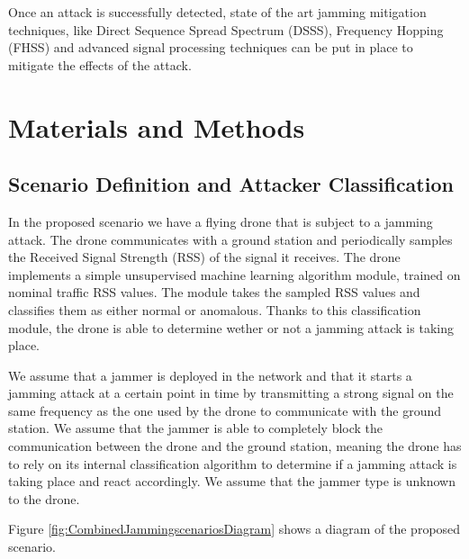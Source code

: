\documentclass[futureinternet,article,submit,pdftex,moreauthors]{Definitions/mdpi}
\begin{document}
Once an attack is successfully detected, state of the art jamming mitigation techniques, like Direct Sequence Spread Spectrum (DSSS), Frequency Hopping (FHSS) and advanced signal processing techniques can be put in place to mitigate the 
effects of the attack. 

\section{Materials and Methods}

\subsection{Scenario Definition and Attacker Classification}

In the proposed scenario we have a flying drone that is subject to a jamming attack. The drone communicates with a ground station and periodically samples the Received Signal Strength (RSS) of the signal it receives. 
The drone implements a simple unsupervised machine learning algorithm module, trained on nominal traffic RSS values. The module takes the sampled RSS values and classifies them as either normal or anomalous. Thanks to this classification module, the drone is able to determine wether or not a jamming attack is taking place. 

We assume that a jammer is deployed in the network and that it starts a jamming attack at a certain point in time by transmitting a strong signal on the same frequency as the one used by the drone to communicate with the ground station.
We assume that the jammer is able to completely block the communication between the drone and the ground station, meaning the drone has to rely on its internal classification algorithm to determine if a jamming attack is taking place and react accordingly.
We assume that the jammer type is unknown to the drone. 

Figure \ref{fig:CombinedJammingscenariosDiagram} shows a diagram of the proposed scenario. 
\end{document}
